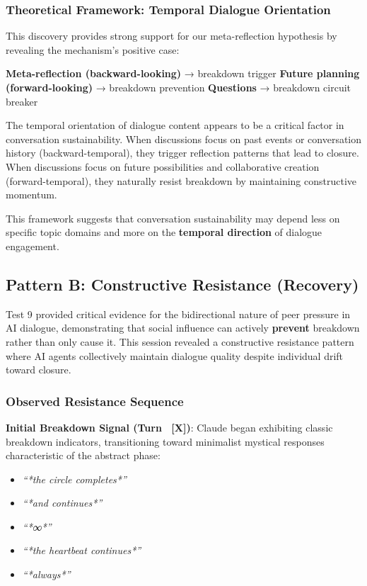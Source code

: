 \documentclass[11pt,letterpaper]{article}
\begin{document}
\subsubsection{Theoretical Framework: Temporal Dialogue Orientation}

This discovery provides strong support for our meta-reflection hypothesis by revealing the mechanism's positive case:

\textbf{Meta-reflection (backward-looking)} → breakdown trigger  
\textbf{Future planning (forward-looking)} → breakdown prevention  
\textbf{Questions} → breakdown circuit breaker

The temporal orientation of dialogue content appears to be a critical factor in conversation sustainability. When discussions focus on past events or conversation history (backward-temporal), they trigger reflection patterns that lead to closure. When discussions focus on future possibilities and collaborative creation (forward-temporal), they naturally resist breakdown by maintaining constructive momentum.

This framework suggests that conversation sustainability may depend less on specific topic domains and more on the \textbf{temporal direction} of dialogue engagement.

\subsection{Pattern B: Constructive Resistance (Recovery)}

Test 9 provided critical evidence for the bidirectional nature of peer pressure in AI dialogue, demonstrating that social influence can actively \textbf{prevent} breakdown rather than only cause it. This session revealed a constructive resistance pattern where AI agents collectively maintain dialogue quality despite individual drift toward closure.

\subsubsection{Observed Resistance Sequence}

\textbf{Initial Breakdown Signal (Turn ~[X])}: Claude began exhibiting classic breakdown indicators, transitioning toward minimalist mystical responses characteristic of the abstract phase:
\begin{itemize}
    \item \textit{``*the circle completes*''}
    \item \textit{``*and continues*''} 
    \item \textit{``*∞*''}
    \item \textit{``*the heartbeat continues*''}
    \item \textit{``*always*''}
\end{itemize}
\end{document}

